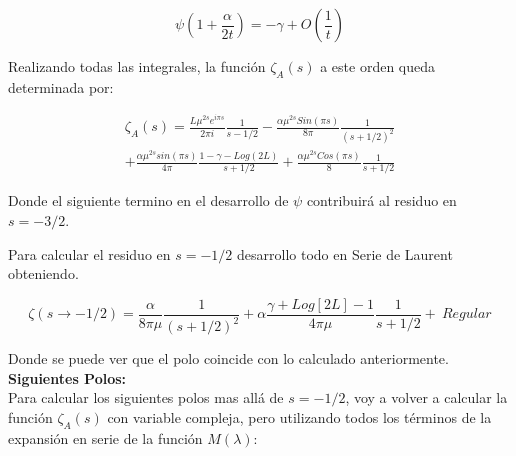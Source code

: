 \begin{equation}
    \psi(1 + \frac{\alpha}{2 t}) =
    - \gamma + O \left( \frac{1}{t} \right)
\end{equation}

Realizando todas las integrales, la función $ \zeta _A (s)$ a este orden queda determinada por:  

\begin{equation}
\begin{array}{c}
    \zeta _A (s)  = 
    \frac{L \mu ^{2 s} e ^{i \pi s}}{2 \pi i} \frac{1}{s-1/2} 
    -\frac{\alpha \mu ^{2s} Sin(\pi s)}{8 \pi} \frac{1}{(s+1/2) ^2} \\
    + \frac{\alpha \mu ^{2s} sin (\pi s) }{4 \pi } \frac{1 - \gamma -  Log(2 L)}{s+1/2}
    + \frac{\alpha \mu ^{2s} Cos(\pi s)}{8} \frac{1}{s+1/2}
    
\end{array}
\end{equation}

Donde el siguiente termino en el desarrollo de $ \psi $ contribuirá al residuo en $s = -3/2$.

Para calcular el residuo en $s=-1/2$ desarrollo todo en Serie de Laurent obteniendo.

\begin{equation}
	\zeta (s \rightarrow -1/2) = 
     \frac{\alpha}{8 \pi \mu } \frac{1}{(s+1/2)^2} + 
    \alpha \frac{\gamma + Log[2 L] - 1}{4 \pi \mu } \frac{1}{s+1/2} + \ Regular
\label{eq.desarrollo}
\end{equation}

Donde se puede ver que el polo coincide con lo calculado anteriormente. \\


\textbf{Siguientes Polos:} \\

Para calcular los siguientes polos mas allá de $s=-1/2$, voy a volver a calcular la función $\zeta _A (s) $ con variable compleja, pero utilizando todos los términos de la expansión en serie de la función $M ( \lambda )$:

